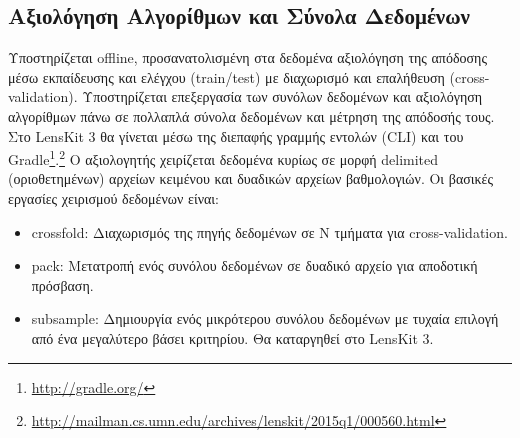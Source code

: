 \subsection{Αξιολόγηση Αλγορίθμων και Σύνολα Δεδομένων}
Υποστηρίζεται {\en offline}, προσανατολισμένη στα δεδομένα αξιολόγηση της απόδοσης μέσω εκπαίδευσης και ελέγχου ({\en train/test}) με διαχωρισμό και επαλήθευση ({\en cross-validation}). Υποστηρίζεται επεξεργασία των συνόλων δεδομένων και αξιολόγηση αλγορίθμων πάνω σε πολλαπλά σύνολα δεδομένων και μέτρηση της απόδοσής τους. Στο {\en LensKit 3} θα γίνεται μέσω της διεπαφής γραμμής εντολών ({\en CLI}) και του {\en Gradle}\footnote{\en \url{http://gradle.org/}}.\footnote{\en \url{http://mailman.cs.umn.edu/archives/lenskit/2015q1/000560.html}} Ο αξιολογητής χειρίζεται δεδομένα κυρίως σε μορφή {\en delimited} (οριοθετημένων) αρχείων κειμένου και δυαδικών αρχείων βαθμολογιών. Οι βασικές εργασίες χειρισμού δεδομένων είναι: 
\begin{itemize}
 \item {\en crossfold}: Διαχωρισμός της πηγής δεδομένων σε Ν τμήματα για {\en cross-validation}.
 \item {\en pack}: Μετατροπή ενός συνόλου δεδομένων σε δυαδικό αρχείο για αποδοτική πρόσβαση.
 \item {\en subsample}: Δημιουργία ενός μικρότερου συνόλου δεδομένων με τυχαία επιλογή από ένα μεγαλύτερο βάσει κριτηρίου. Θα καταργηθεί στο {\en LensKit 3}.
\end{itemize}
